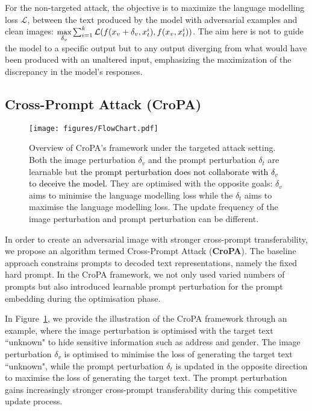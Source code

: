 For the non-targeted attack, the objective is to maximize the language modelling loss \( \mathcal{L} \), between the text produced by the model with adversarial examples and clean images: \( \small
        \underset{\delta_v}{\text{max}} \sum_{i=1}^{k} \mathcal{L}(f(x_v + \delta_v, x_t^i), f(x_v, x_t^i))\).
The aim here is not to guide the model to a specific output but to any output diverging from what would have been produced with an unaltered input, emphasizing the maximization of the discrepancy in the model's responses. 

\subsection{Cross-Prompt Attack (CroPA)}

\begin{figure}[t!]
    \centering
    \texttt{[image: figures/FlowChart.pdf]}\vspace{-0.2cm}
    \caption[Overview of CroPA’s framework]
    {\footnotesize{
    Overview of CroPA’s framework under the targeted attack setting. Both the image perturbation $\delta_v$ and the prompt perturbation $\delta_t$ are learnable but \textcolor{black}{the prompt perturbation does not collaborate  with $\delta_v$ to deceive the model.} They are optimised with the opposite goals:  $\delta_v$ aims to minimise the language modelling loss while the $\delta_t$ aims to maximise the language modelling loss. 
    The update frequency of the image perturbation and prompt perturbation can be different.
    }}
    \label{fig:dapa-pipeline}
\end{figure}

In order to create an adversarial image with stronger cross-prompt transferability, we propose an algorithm termed Cross-Prompt Attack (\textbf{CroPA}). The baseline approach constrains prompts to decoded text representations, namely the fixed hard prompt. In the CroPA framework, we not only used varied numbers of prompts but also introduced learnable prompt perturbation for the prompt embedding during the optimisation phase. 

 In Figure~\ref{fig:dapa-pipeline}, we provide the illustration of the CroPA framework through an example, where the image perturbation is optimised with the target text ``unknown" to hide sensitive information such as address and gender. The image perturbation $\delta_v$ is optimised to minimise the loss of generating the target text ``unknown", while the prompt perturbation  $\delta_t$ is updated in the opposite direction to maximise the loss of generating the target text. The prompt perturbation gains increasingly stronger cross-prompt transferability during this competitive update process.
    

